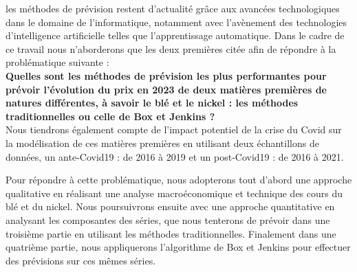les méthodes de prévision restent d'actualité grâce aux avancées technologiques dans le domaine de l'informatique, notamment avec l'avènement des technologies 
d'intelligence artificielle telles que l'apprentissage automatique. Dans le cadre de ce travail nous n'aborderons que les deux premières citée afin de répondre à la
problématique suivante : \\[11pt]
\textbf{Quelles sont les méthodes de prévision les plus performantes pour prévoir l'évolution du prix en 2023 de deux matières premières de natures différentes, à savoir 
le blé et le nickel : les méthodes traditionnelles ou celle de Box et Jenkins ?}\\[11pt]
Nous tiendrons également compte de l'impact potentiel de la crise du Covid sur la modélisation de ces matières premières en utilisant deux échantillons de données, un 
ante-Covid19 : de 2016 à 2019 et un post-Covid19 : de 2016 à 2021.

Pour répondre à cette problématique, nous adopterons tout d'abord une approche qualitative en réalisant une analyse macroéconomique et technique des cours du blé et du 
nickel. Nous poursuivrons ensuite avec une approche quantitative en analysant les composantes des séries, que nous tenterons de prévoir dans une troisième partie en 
utilisant les méthodes traditionnelles. Finalement dans une quatrième partie, nous appliquerons l'algorithme de Box et Jenkins pour effectuer des prévisions sur ces mêmes 
séries.